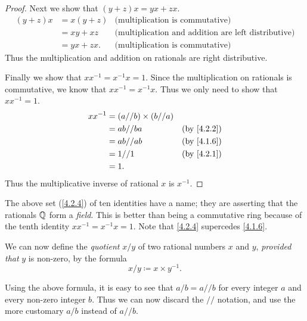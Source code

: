 \begin{proof}
  Next we show that \((y + z)x = yx + zx\).
  \begin{align*}
    (y + z)x & = x(y + z) & \text{(multiplication is commutative)}                     \\
             & = xy + xz  & \text{(multiplication and addition are left distributive)} \\
             & = yx + zx. & \text{(multiplication is commutative)}
  \end{align*}
  Thus the multiplication and addition on rationals are right distributive.

  Finally we show that \(xx^{-1} = x^{-1}x = 1\).
  Since the multiplication on rationals is commutative, we know that \(xx^{-1} = x^{-1}x\).
  Thus we only need to show that \(xx^{-1} = 1\).
  \begin{align*}
    xx^{-1} & = (a // b) \times (b // a)                            \\
            & = ab // ba                 & \text{(by \cref{4.2.2})} \\
            & = ab // ab                 & \text{(by \cref{4.1.6})} \\
            & = 1 // 1                   & \text{(by \cref{4.2.1})} \\
            & = 1.
  \end{align*}
  Thus the multiplicative inverse of rational \(x\) is \(x^{-1}\).
\end{proof}

\begin{rmk}\label{4.2.5}
  The above set (\cref{4.2.4}) of ten identities have a name;
  they are asserting that the rationals \(\mathbb{Q}\) form a \emph{field}.
  This is better than being a commutative ring because of the tenth identity \(xx^{-1} = x^{-1}x = 1\).
  Note that \cref{4.2.4} supercedes \cref{4.1.6}.
\end{rmk}

\begin{note}
  We can now define the \emph{quotient} \(x / y\) of two rational numbers \(x\) and \(y\), \emph{provided that} \(y\) is non-zero, by the formula
  \[
    x / y \coloneqq x \times y^{-1}.
  \]
\end{note}

\begin{note}
  Using the above formula, it is easy to see that \(a / b = a // b\) for every integer \(a\) and every non-zero integer \(b\).
  Thus we can now discard the \(//\) notation, and use the more customary \(a / b\) instead of \(a // b\).
\end{note}

